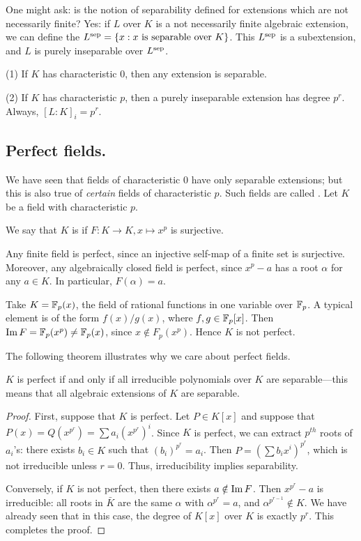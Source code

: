 One might ask: is the notion of separability defined for extensions which are not necessarily finite?
Yes: if $L$ over $K$ is a not necessarily finite algebraic extension, we can define the  $L^{\mathrm{sep}} = \left\{x : \text{$x$ is separable over $K$}\right\}$.
This $L^{\mathrm{sep}}$ is a subextension, and $L$ is purely inseparable over $L^{\mathrm{sep}}$.

\begin{rmk}
(1) If $K$ has characteristic $0$, then any extension is separable.

(2) If $K$ has characteristic $p$, then a purely inseparable extension has degree $p^r$.
Always, $[L:K]_i = p^r$.
\end{rmk}

\subsection{Perfect fields.}
We have seen that fields of characteristic $0$ have only separable extensions; but this is also true of \emph{certain} fields of characteristic $p$.
Such fields are called .
Let $K$ be a field with characteristic $p$.
\begin{dfn}
We say that $K$ is  if $F: K \to K, x \mapsto x^p$ is surjective.
\end{dfn}
\begin{ex}
Any finite field is perfect, since an injective self-map of a finite set is surjective.
Moreover, any algebraically closed field is perfect, since $x^p - a$ has a root $\alpha$ for any $a \in K$. 
In particular, $F(\alpha) = a$.
\end{ex}
\begin{ex}
Take $K = \mathbb{F}_p(x)$, the field of rational functions in one variable over $\mathbb{F}_p$.
A typical element is of the form $f(x)/g(x)$, where $f,g \in \mathbb{F}_p[x]$.
Then $\operatorname{Im}{F} = \mathbb{F}_p(x^p) \neq \mathbb{F}_p(x)$, since $x \notin F_p(x^p)$.
Hence $K$ is not perfect.
\end{ex}
The following theorem illustrates why we care about perfect fields.
\begin{thm}
$K$ is perfect if and only if all irreducible polynomials over $K$ are separable---this means that all algebraic extensions of $K$ are separable.
\end{thm}
\begin{proof}
First, suppose that $K$ is perfect.
Let $P \in K[x]$ and suppose that $P(x) = Q(x^{p^r}) = \sum a_i(x^{p^r})^i$.
Since $K$ is perfect, we can extract $p^{th}$ roots of $a_i$'s: there exists $b_i \in K$ such that $(b_i)^{p^r} = a_i$.
Then $P = \left(\sum b_i x^i\right)^{p^r}$, which is not irreducible unless $r = 0$.
Thus, irreducibility implies separability.

Conversely, if $K$ is not perfect, then there exists $a \notin \operatorname{Im}{F}$.
Then $x^{p^r} - a$ is irreducible: all roots in $\bar{K}$ are the same $\alpha$ with $\alpha^{p^r} = a$, and $\alpha^{p^{r-1}} \notin K$.
We have already seen that in this case, the degree of $K[x]$ over $K$ is exactly $p^r$.
This completes the proof.
\end{proof}
